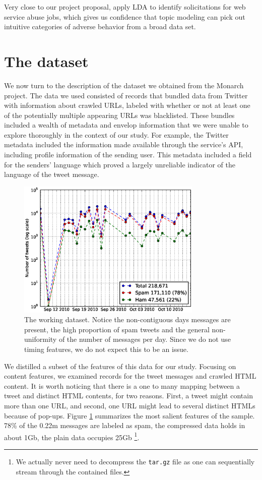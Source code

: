 \documentclass[times, 11pt, twocolumn]{article}
\begin{document}
Very close to our project proposal, \cite{Kim2011} apply LDA to identify solicitations 
for web service abuse jobs, which gives us confidence that topic modeling can pick out 
intuitive categories of adverse behavior from a broad data set. 

\section{The dataset}
We now turn to the description of the dataset we obtained from the Monarch project. The data 
we used consisted of records that bundled data from Twitter with information about crawled URLs, 
labeled with whether or not at least one of the potentially multiple appearing URLs was blacklisted.
These bundles included a wealth of metadata and envelop information that we were unable 
to explore thoroughly in the context of our study. For example, the Twitter metadata included 
the information made available through the service's API, including profile information of 
the sending user. This metadata included a field for the senders' language which proved 
a largely unreliable indicator of the language of the tweet message.

\begin{figure}[!h]\centering
	\includegraphics[width=8.8cm]{tweets_per_day.eps}
	\caption{The working dataset. Notice the non-contiguous days messages are present,
	the high proportion of spam tweets and the general non-uniformity of the number of
	messages per day. Since we do not use timing features, we do not expect this to
	be an issue.}
	\label{sample}
\end{figure}


We distilled a subset of the features of this data for our study. Focusing on content features, 
we examined records for the tweet messages and crawled HTML content. It is worth noticing that
there is a one to many mapping between a tweet and distinct HTML contents, for two reasons. First, 
a tweet might contain more than one URL, and second, one URL might lead to several distinct HTMLs
because of pop-ups. Figure \ref{sample} summarizes the most salient features of the sample. 78\% of the 0.22m
messages are labeled as spam, the compressed data holds in about 1Gb, the plain data occupies 25Gb
\footnote{We actually never need to decompress the \texttt{tar.gz} file as one can sequentially 
stream through the contained files.}.
\end{document}
